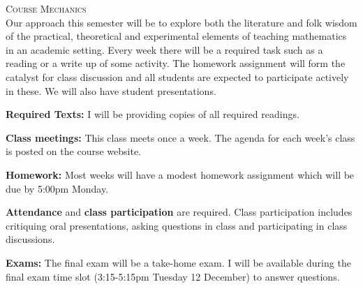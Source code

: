 \documentclass[12pt]{article}
\newcommand{\sups}[1]{\textsuperscript{#1}}
\begin{document}
\textsc{Course Mechanics}\\
Our approach this semester will be to explore both the literature and folk wisdom of the practical, theoretical and experimental elements of teaching mathematics in an academic setting. Every week there will be a required task such as a reading or a write up of some activity. The homework assignment will form the catalyst for class discussion and all students are expected to participate actively in these. We will also have student presentations.

 
\textbf{Required Texts:} 
I will be providing copies of all required readings.

\textbf{Class meetings:} This class meets once a week. The agenda for each week's class is posted on the course website.

\textbf{Homework:} Most weeks will have a modest homework assignment which will be due by 5:00pm Monday.


\textbf{Attendance} and {\bf class participation} are required. Class participation includes critiquing oral presentations, asking questions in class and participating in class discussions. 


\textbf{Exams:} %
The final exam will be a take-home exam. I will be available during the final exam time slot (3:15-5:15pm Tuesday 12 December) to answer questions.
\end{document}
